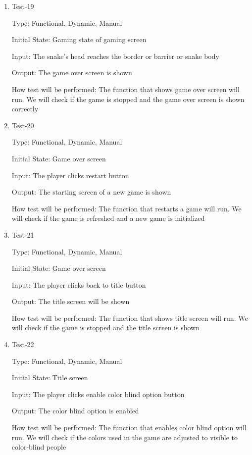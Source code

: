 \documentclass[12pt, titlepage]{article}
\begin{document}
\begin{enumerate}
\item{Test-19\\}

Type: Functional, Dynamic, Manual

Initial State: Gaming state of gaming screen

Input: The snake's head reaches the border or barrier or snake body

Output: The game over screen is shown

How test will be performed: The function that shows game over screen will run. We will check if the game is stopped and the game over screen is shown correctly

\item{Test-20\\}

Type: Functional, Dynamic, Manual

Initial State: Game over screen

Input: The player clicks restart button

Output: The starting screen of a new game is shown

How test will be performed: The function that restarts a game will run. We will check if the game is refreshed and a new game is initialized

\item{Test-21\\}

Type: Functional, Dynamic, Manual

Initial State: Game over screen

Input: The player clicks back to title button

Output: The title screen will be shown

How test will be performed: The function that shows title screen will run. We will check if the game is stopped and the title screen is shown

\item{Test-22\\}

Type: Functional, Dynamic, Manual

Initial State: Title screen

Input: The player clicks enable color blind option button

Output: The color blind option is enabled

How test will be performed: The function that enables color blind option will run. We will check if the colors used in the game are adjusted to visible to color-blind people

\end{enumerate}
\end{document}
